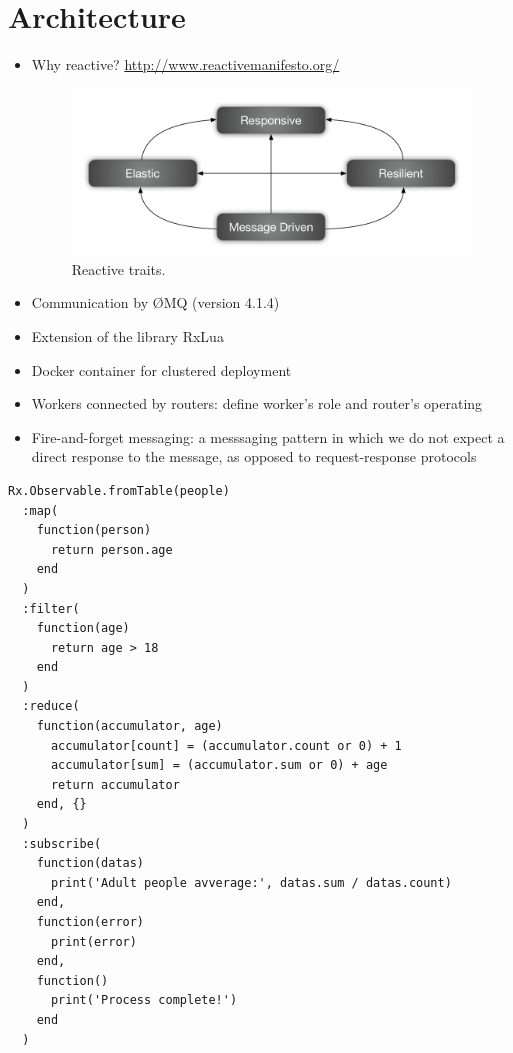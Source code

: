 \section{Architecture}
\label{sec:architecture}

\begin{itemize}
  \item Why reactive?
    \url{http://www.reactivemanifesto.org/}
    \begin{figure}[t!]
      \centering
      \includegraphics[width=.99\linewidth]{images/reactive-traits}
      \caption{Reactive traits.}
      \label{fig:reactive-traits}
    \end{figure}
  \item Communication by ØMQ (version 4.1.4)
  \item Extension of the library RxLua
  \item Docker container for clustered deployment
  \item Workers connected by routers: define worker's role and router's operating
  \item Fire-and-forget messaging: a messsaging pattern in which we do not expect a direct response to the message, as opposed to request-response protocols
\end{itemize}



\begin{lstlisting}[frame=single]
Rx.Observable.fromTable(people)
  :map(
    function(person)
      return person.age
    end
  )
  :filter(
    function(age)
      return age > 18
    end
  )
  :reduce(
    function(accumulator, age)
      accumulator[count] = (accumulator.count or 0) + 1
      accumulator[sum] = (accumulator.sum or 0) + age
      return accumulator
    end, {}
  )
  :subscribe(
    function(datas)
      print('Adult people avverage:', datas.sum / datas.count)
    end,
    function(error)
      print(error)
    end,
    function()
      print('Process complete!')
    end
  )
\end{lstlisting}
